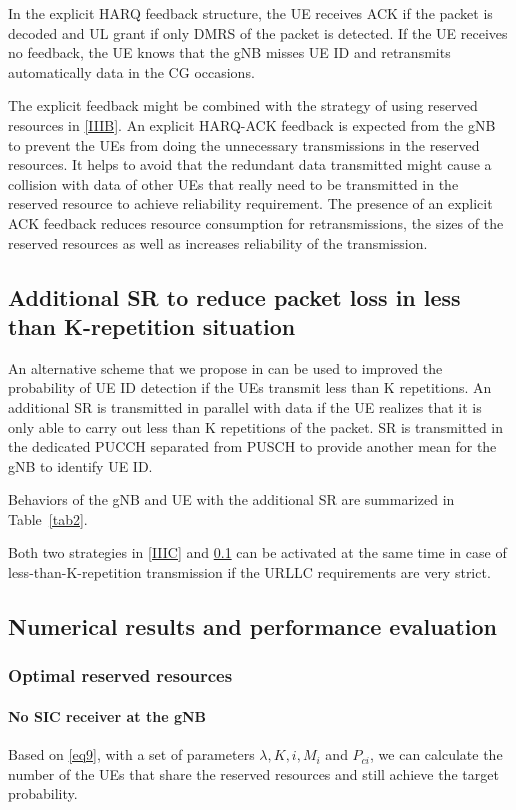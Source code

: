 \documentclass{ieeeaccess}
\begin{document}
In the explicit HARQ feedback structure, the UE receives ACK if the packet is decoded and UL grant if only DMRS of the packet is detected. If the UE receives no feedback, the UE knows that the gNB misses UE ID and retransmits automatically data in the CG occasions.

The explicit feedback might be combined with the strategy of using reserved resources in \ref{IIIB}. An explicit HARQ-ACK feedback is expected from the gNB to prevent the UEs from doing the unnecessary transmissions in the reserved resources. It helps to avoid that the redundant data transmitted might cause a collision with data of other UEs that really need to be transmitted in the reserved resource to achieve reliability requirement. The presence of an explicit ACK feedback reduces resource consumption for retransmissions, the sizes of the reserved resources as well as increases reliability of the transmission. 

\subsection{Additional SR to reduce packet loss in less than K-repetition situation}\label{IIID}

An alternative scheme that we propose in \cite{ad100} can be used to improved the probability of UE ID detection if the UEs transmit less than K repetitions. An additional SR is transmitted in parallel with data if the UE realizes that it is only able to carry out less than K repetitions of the packet. SR is transmitted in the dedicated PUCCH separated from PUSCH to provide another mean for the gNB to identify UE ID.

Behaviors of the gNB and UE with the additional SR are summarized in Table~\ref{tab2}. 

Both two strategies in \ref{IIIC} and \ref{IIID} can be activated at the same time in case of less-than-K-repetition transmission if the URLLC requirements are very strict.

\subsection{Numerical results and performance evaluation}\label{IV}

\subsubsection{Optimal reserved resources}
\paragraph{No SIC receiver at the gNB}\label{IVB1}
Based on \eqref{eq9}, with a set of parameters  $\lambda, K, i, M_{i}$ and $P_{ci}$, we can calculate the number of the UEs that share the reserved resources and still achieve the target probability.
\end{document}
